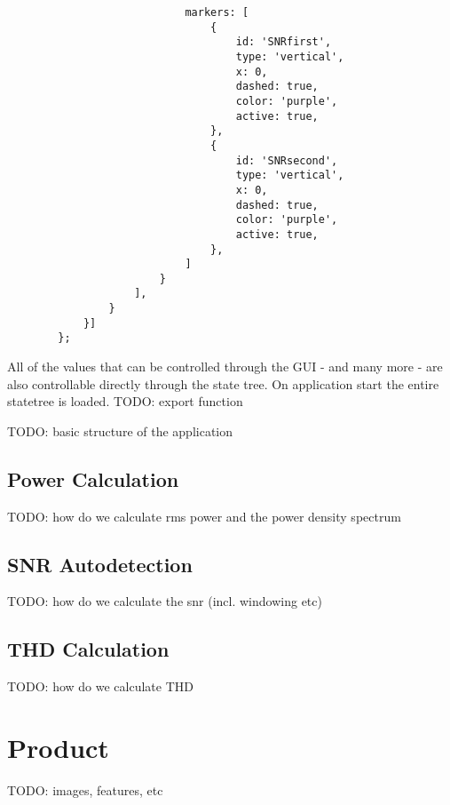 \begin{tcolorbox}
\begin{verbatim}
                            markers: [
                                {
                                    id: 'SNRfirst',
                                    type: 'vertical',
                                    x: 0,
                                    dashed: true,
                                    color: 'purple',
                                    active: true,
                                },
                                {
                                    id: 'SNRsecond',
                                    type: 'vertical',
                                    x: 0,
                                    dashed: true,
                                    color: 'purple',
                                    active: true,
                                },
                            ]
                        }
                    ],
                }
            }]
        };
    \end{verbatim}
\end{tcolorbox}

All of the values that can be controlled through the GUI - and many more - are also controllable directly through the state tree.
On application start the entire statetree is loaded. TODO: export function


TODO: basic structure of the application

\subsection{Power Calculation}

TODO: how do we calculate rms power and the power density spectrum

\subsection{SNR Autodetection}

TODO: how do we calculate the snr (incl. windowing etc)

\subsection{THD Calculation}

TODO: how do we calculate THD

\section{Product}

TODO: images, features, etc


